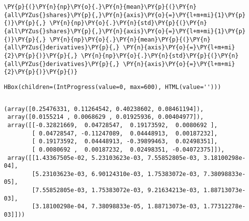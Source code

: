 \begin{tcolorbox}[breakable, size=fbox, boxrule=1pt, pad at break*=1mm,colback=cellbackground, colframe=cellborder]
\begin{Verbatim}[commandchars=\\\{\}]
\PY{p}{(}\PY{n}{np}\PY{o}{.}\PY{n}{mean}\PY{p}{(}\PY{n}{all\PYZus{}shares}\PY{p}{,}\PY{n}{axis}\PY{o}{=}\PY{l+m+mi}{1}\PY{p}{)}\PY{p}{,} \PY{n}{np}\PY{o}{.}\PY{n}{std}\PY{p}{(}\PY{n}{all\PYZus{}shares}\PY{p}{,}\PY{n}{axis}\PY{o}{=}\PY{l+m+mi}{1}\PY{p}{)}\PY{p}{,} \PY{n}{np}\PY{o}{.}\PY{n}{mean}\PY{p}{(}\PY{n}{all\PYZus{}derivatives}\PY{p}{,} \PY{n}{axis}\PY{o}{=}\PY{l+m+mi}{2}\PY{p}{)}\PY{p}{,} \PY{n}{np}\PY{o}{.}\PY{n}{std}\PY{p}{(}\PY{n}{all\PYZus{}derivatives}\PY{p}{,} \PY{n}{axis}\PY{o}{=}\PY{l+m+mi}{2}\PY{p}{)}\PY{p}{)}
\end{Verbatim}
\end{tcolorbox}


    \begin{verbatim}
HBox(children=(IntProgress(value=0, max=600), HTML(value='')))
    \end{verbatim}


    \begin{Verbatim}[commandchars=\\\{\}]

    \end{Verbatim}

            \begin{tcolorbox}[breakable, size=fbox, boxrule=.5pt, pad at break*=1mm, opacityfill=0]
\begin{Verbatim}[commandchars=\\\{\}]
(array([0.25476331, 0.11264542, 0.40238602, 0.08461194]),
 array([0.0155214 , 0.0068629 , 0.01925936, 0.00404977]),
 array([[-0.32821669,  0.04728547,  0.19173592,  0.0080692 ],
        [ 0.04728547, -0.11247089,  0.04448913,  0.00187232],
        [ 0.19173592,  0.04448913, -0.39899463,  0.02498351],
        [ 0.0080692 ,  0.00187232,  0.02498351, -0.04072375]]),
 array([[1.43367505e-02, 5.23103623e-03, 7.55852805e-03, 3.18100298e-04],
        [5.23103623e-03, 6.90124310e-03, 1.75383072e-03, 7.38098833e-05],
        [7.55852805e-03, 1.75383072e-03, 9.21634213e-03, 1.88713073e-03],
        [3.18100298e-04, 7.38098833e-05, 1.88713073e-03, 1.77312278e-03]]))
\end{Verbatim}
\end{tcolorbox}

